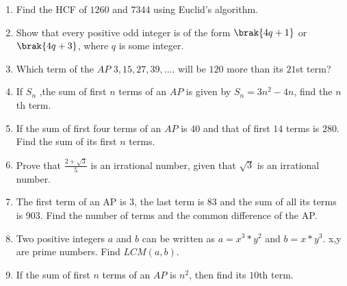 \begin{enumerate}
\item Find the HCF of $1260$ and $7344$ using Euclid's algorithm.
\item Show that every positive odd integer is of the form $\brak{4q+1}$ or $\brak{4q+3}$, where $q$ is some integer.
\item Which term of the $AP$ $3, 15, 27, 39, ....$ will be $120$ more than its $21$st term?
\item If $S_n$ ,the sum of first $n$ terms of an $AP$ is given by $S_n=3n^2-4n$, find the $n$th term.
\item If the sum of first four terms of an $AP$ is $40$ and that of first $14$ terms is $280$. Find the sum of its first $n$ terms.
\item Prove that $\frac{2+\sqrt{3}}{5}$  is an irrational number, given that $\sqrt{3}$ is an irrational number.
\item The first term of an AP is 3, the last term is 83 and the sum of all its terms is 903. Find the number of terms and the common difference of the AP.
\item Two positive integers $a$ and $b$ can be written as $a = x^3*y^2$ and $b = x*y^3$. x,y are prime numbers. Find $LCM (a, b)$.
\item If the sum of first $n$ terms of an $AP$ is $n^2$, then find its $10$th term.
\end{enumerate}